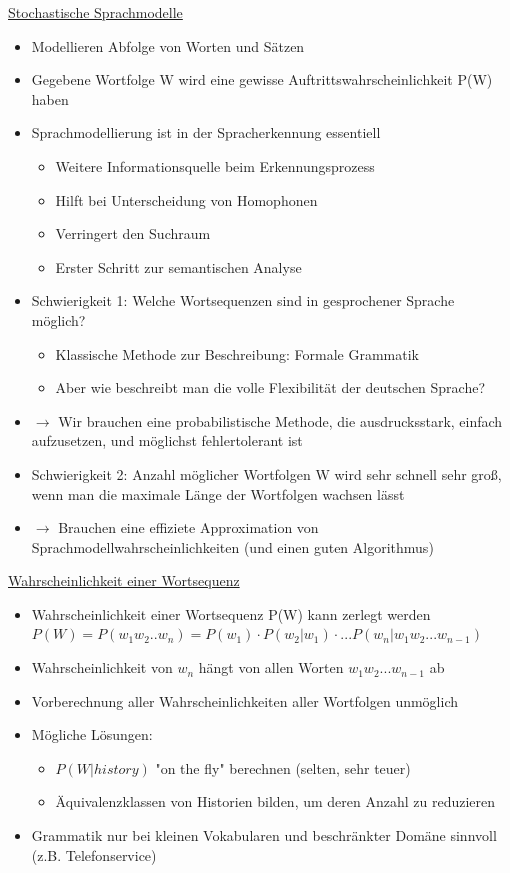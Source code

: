 \documentclass[a4paper,10pt,oneside]{article}
\begin{document}
\underline{Stochastische Sprachmodelle} \\
	\begin{itemize}
		\item Modellieren Abfolge von Worten und Sätzen
		\item Gegebene Wortfolge W wird eine gewisse Auftrittswahrscheinlichkeit P(W) haben
		\item Sprachmodellierung ist in der Spracherkennung essentiell
			\begin{itemize}
				\item Weitere Informationsquelle beim Erkennungsprozess
				\item Hilft bei Unterscheidung von Homophonen
				\item Verringert den Suchraum 
				\item Erster Schritt zur semantischen Analyse
			\end{itemize}
		\item Schwierigkeit 1: Welche Wortsequenzen sind in gesprochener Sprache möglich?
			\begin{itemize}
				\item Klassische Methode zur Beschreibung: Formale Grammatik
				\item Aber wie beschreibt man die volle Flexibilität der deutschen Sprache?
			\end{itemize}
		\item[] $\rightarrow$ Wir brauchen eine probabilistische Methode, die ausdrucksstark, einfach aufzusetzen, und möglichst fehlertolerant ist
		\item Schwierigkeit 2: Anzahl möglicher Wortfolgen W wird sehr schnell sehr groß, wenn man die maximale Länge der Wortfolgen wachsen lässt
		\item $\rightarrow$ Brauchen eine effiziete Approximation von Sprachmodellwahrscheinlichkeiten (und einen guten Algorithmus)
	\end{itemize}
	
\underline{Wahrscheinlichkeit einer Wortsequenz} \\
	\begin{itemize}
		\item Wahrscheinlichkeit einer Wortsequenz P(W) kann zerlegt werden $P(W) = P(w_1 w_2 .. w_n) = P(w_1) \cdot P(w_2 | w_1) \cdot ... P(w_n | w_1 w_2 ... w_{n-1})$
		\item Wahrscheinlichkeit von $w_n$ hängt von allen Worten $w_1 w_2 ... w_{n-1}$ ab
		\item Vorberechnung aller Wahrscheinlichkeiten aller Wortfolgen unmöglich
		\item Mögliche Lösungen:
			\begin{itemize}
				\item $P(W|history)$ "on the fly" berechnen (selten, sehr teuer)
				\item Äquivalenzklassen von Historien bilden, um deren Anzahl zu reduzieren
			\end{itemize}
		\item Grammatik nur bei kleinen Vokabularen und beschränkter Domäne sinnvoll (z.B. Telefonservice)
	\end{itemize}
\end{document}
